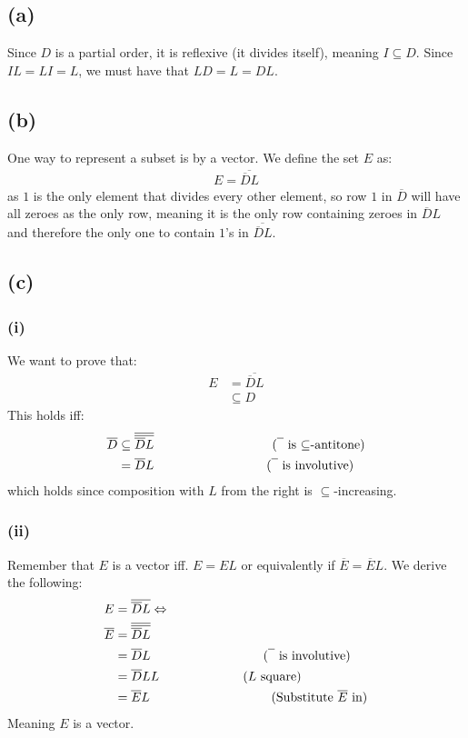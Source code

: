 \documentclass[a4paper, fleqn]{article}
\newcommand{\comment}[1]{%
  \text{\phantom{(#1)}} \tag{#1}}
\begin{document}
\subsection{(a)}
Since $D$ is a partial order, it is reflexive (it divides itself), meaning $I\subseteq
D$. Since $IL=LI=L$, we must have that $LD=L=DL$.

\subsection{(b)}
One way to represent a subset is by a vector. We define the set $E$ as:
\begin{align*}
  E = \overline{\overline{D}L}
\end{align*}
as $1$ is the only element that divides every other element, so row $1$ in $\overline{D}$
will have all zeroes as the only row, meaning it is the only row containing zeroes in
$\overline{D}L$ and therefore the only one to contain $1$'s in $\overline{\overline{D}L}$.

\subsection{(c)}
\subsubsection{(i)}
We want to prove that:
\begin{align*}
  E &= \overline{\overline{D}L} \\
    &\subseteq D
\end{align*}
This holds iff:
\begin{align*}
  \overline{D}&\subseteq \overline{\overline{\overline{D}L}}
  \comment{$\overline{\phantom{I}}$ is
$\subseteq$-antitone} \\
&=\overline{D}L \comment{$\overline{\phantom{I}}$ is involutive}
\end{align*}
which holds since composition with $L$ from the right is $\subseteq$-increasing.

\subsubsection{(ii)}
Remember that $E$ is a vector iff. $E=EL$ or equivalently if $\overline{E}=\overline{E}L$.
We derive the following:
\begin{align*}
  E&=\overline{\overline{D}L} \Leftrightarrow \\
  \overline{E}&=\overline{\overline{\overline{D}L}} \\
              &=\overline{D}L \comment{$\overline{\phantom{I}}$ is involutive} \\
              &=\overline{D}LL \comment{$L$ square} \\
              &=\overline{E}L \comment{Substitute $\overline{E}$ in}
\end{align*}
Meaning $E$ is a vector.
\end{document}
